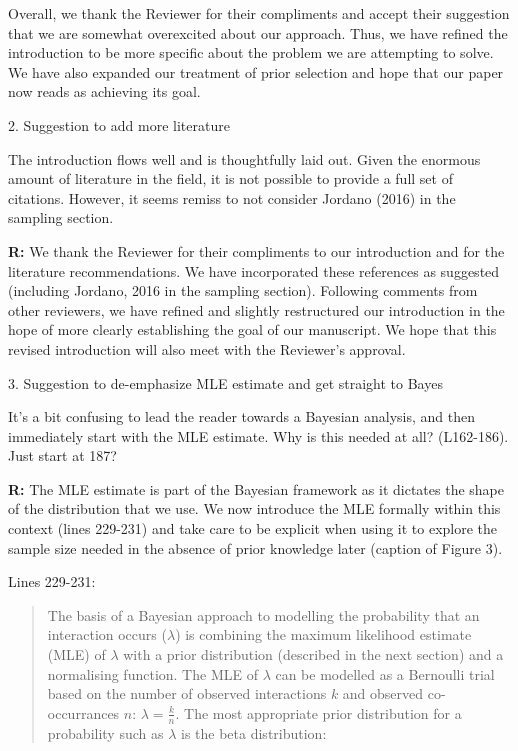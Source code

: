 \documentclass[12pt]{letter}
\newenvironment{refquote}{\bigskip \begin{it}}{\end{it}\smallskip}
\begin{document}
		Overall, we thank the Reviewer for their compliments and accept their suggestion that we are somewhat overexcited about our approach. Thus, we have refined the introduction to be more specific about the problem we are attempting to solve. We have also expanded our treatment of prior selection and hope that our paper now reads as achieving its goal.


	2. Suggestion to add more literature

		\begin{refquote}
		The introduction flows well and is thoughtfully laid out. Given the enormous amount of literature in the field, it is not possible to provide a full set of citations. However, it seems remiss to not consider Jordano (2016) in the sampling section.
		\end{refquote}

		\textbf{R:} We thank the Reviewer for their compliments to our introduction and for the literature recommendations. We have incorporated these references as suggested (including Jordano, 2016 in the sampling section). Following comments from other reviewers, we have refined and slightly restructured our introduction in the hope of more clearly establishing the goal of our manuscript. We hope that this revised introduction will also meet with the Reviewer's approval. 


	3. Suggestion to de-emphasize MLE estimate and get straight to Bayes

		\begin{refquote}
		It’s a bit confusing to lead the reader towards a Bayesian analysis, and then immediately start with the MLE estimate. Why is this needed at all? (L162-186). Just start at 187?
		\end{refquote}

		\textbf{R:} The MLE estimate is part of the Bayesian framework as it dictates the shape of the distribution that we use. We now introduce the MLE formally within this context (lines 229-231) and take care to be explicit when using it to explore the sample size needed in the absence of prior knowledge later (caption of Figure 3).

		Lines 229-231:

		\begin{quotation}
			The basis of a Bayesian approach to modelling the probability that an interaction occurs ($\lambda$) is combining the maximum likelihood estimate (MLE) of $\lambda$ with a prior distribution (described in the next section) and a normalising function. The MLE of $\lambda$ can be modelled as a Bernoulli trial based on the number of observed interactions $k$ and observed co-occurrances $n$: $\lambda = \frac{k}{n}$. The most appropriate prior distribution for a probability such as $\lambda$ is the beta distribution:
		\end{quotation}
\end{document}
